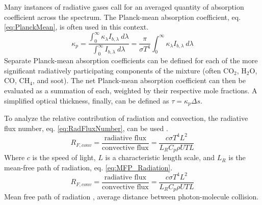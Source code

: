 Many instances of radiative gases call for an averaged quantity of absorption coefficient across the spectrum. The Planck-mean absorption coefficient, eq. \ref{eq:PlanckMean}, is often used in this context.
\begin{equation}
    \kappa{}_p = \frac{\int^\infty_0{\kappa{}_\lambda{}I_{b,\lambda}~d\lambda}}{\int^\infty_0{I_{b,\lambda}~d\lambda}}=\frac{\pi}{\sigma{}T^4}\int^\infty_0{\kappa{}_\lambda{}I_{b,\lambda}~d\lambda}
    \label{eq:PlanckMean}
\end{equation}
Separate Planck-mean absorption coefficients can be defined for each of the more significant radiatively participating components of the mixture (often CO$_2$, H$_2$O, CO, CH$_4$, and soot). The net Planck-mean absorption coefficient can then be evaluated as a summation of each, weighted by their respective mole fractions.
A simplified optical thickness, finally, can be defined as $\tau{}=\kappa{}_p\Delta{s}$.

To analyze the relative contribution of radiation and convection, the radiative flux number, eq. \ref{eq:RadFluxNumber}, can be used \cite{Pai1966RadiationDynamics}.
\begin{equation}
    R_{F,conv}=\frac{\text{radiative flux}}{\text{convective flux}}=\frac{c\sigma{}T^4L^2}{L_RC_p\rho{}UTL}
    \label{eq:RadFluxNumber}
\end{equation}
Where $c$ is the speed of light, $L$ is a characteristic length scale, and $L_R$ is the mean-free path of radiation, eq. \ref{eq:MFP_Radiation}.
\begin{equation}
    R_{F,conv}=\frac{\text{radiative flux}}{\text{convective flux}}=\frac{c\sigma{}T^4L^2}{L_RC_p\rho{}UTL}
    \label{eq:RadFluxNumber}
\end{equation}
Mean free path of radiation \cite{Pai1966RadiationDynamics}, average distance between photon-molecule collision.

